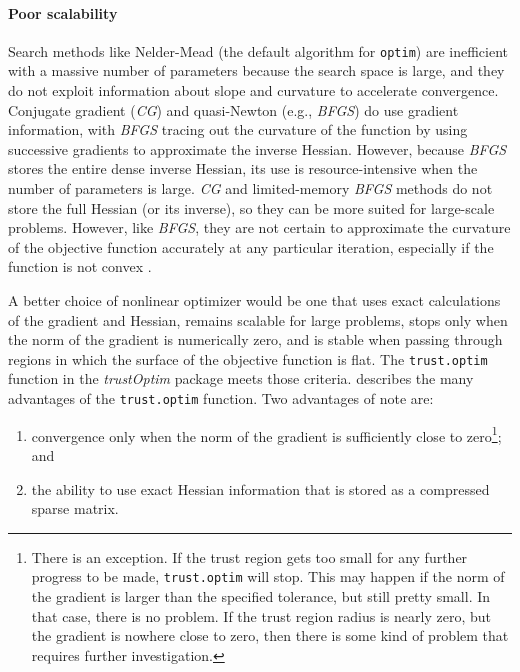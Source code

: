 \documentclass[10pt]{article}\usepackage[]{graphicx}\usepackage[]{color}
\newcommand{\pkg}[1]{\emph{#1}}
\newcommand{\func}[1]{\texttt{#1}}
\newcommand{\method}[1]{\textsl{#1}}
\begin{document}
\paragraph{Poor scalability}   Search methods like Nelder-Mead (the default algorithm for
\func{optim}) are inefficient with a
massive number of parameters because the search space is large, and
they do not exploit information about slope and curvature to accelerate convergence.  Conjugate gradient (\method{CG}) and
quasi-Newton (e.g., \method{BFGS}) do use
gradient information, with \method{BFGS} tracing out the curvature of
the function by using successive gradients to approximate the inverse
Hessian.  However, because \method{BFGS} stores the entire dense
inverse Hessian, its use is resource-intensive when the number of
parameters is large.   \method{CG} and limited-memory \method{BFGS} methods do not store the full Hessian
(or its inverse), so they can be more suited for large-scale
problems. However, like \method{BFGS}, they are not certain to
approximate the curvature of the objective function accurately at any
particular iteration, especially if the function is not convex \citep{R_trustOptim}.

A better choice of nonlinear optimizer would be one that uses exact calculations of the gradient and Hessian,
remains scalable for large problems, stops only when the norm of the
gradient is numerically zero, and is stable when passing through
regions in which the surface of the objective function is flat.  The \func{trust.optim} function
in the \pkg{trustOptim} package meets those criteria.
 describes the many advantages of the
\func{trust.optim} function.  Two advantages of note are:

\begin{enumerate}
\item convergence only when the norm of the
  gradient is sufficiently close to zero\footnote{There is an
    exception.  If the trust region gets too small for any further
    progress to be made, \func{trust.optim} will stop.  This may
    happen if the norm of the gradient is larger than the specified
    tolerance, but still pretty small.  In that case, there is no
    problem.  If the trust region radius is nearly zero, but the
    gradient is nowhere close to zero, then there is some kind of
    problem that requires further investigation.}; and
\item the ability to use exact Hessian information that is stored as a
  compressed sparse matrix.
\end{enumerate}
\end{document}
